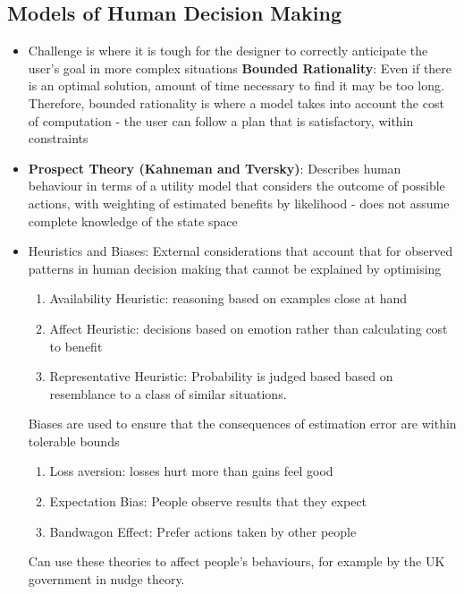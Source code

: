 \documentclass{article}
\begin{document}
\subsection{Models of Human Decision Making}
\begin{itemize}
    \item Challenge is where it is tough for the designer to correctly anticipate the user's goal in more complex situations
    \textbf{Bounded Rationality}: Even if there is an optimal solution, amount of time necessary to find it may be too long. Therefore, bounded rationality is where a model takes into account the cost of computation - the user can follow a plan that is satisfactory, within constraints
    \item \textbf{Prospect Theory (Kahneman and Tversky)}: Describes human behaviour in terms of a utility model that considers the outcome of possible actions, with weighting of estimated benefits by likelihood - does not assume complete knowledge of the state space
    \item Heuristics and Biases: External considerations that account that for observed patterns in human decision making that cannot be explained by optimising 
    \begin{enumerate}
        \item Availability Heuristic: reasoning based on examples close at hand
        \item Affect Heuristic: decisions based on emotion rather than calculating cost to benefit
        \item Representative Heuristic: Probability is judged based based on resemblance to a class of similar situations.
    \end{enumerate}
    
    Biases are used to ensure that the consequences of estimation error are within tolerable bounds
    \begin{enumerate}
        \item Loss aversion: losses hurt more than gains feel good
        \item Expectation Bias: People observe results that they expect
        \item Bandwagon Effect: Prefer actions taken by other people
    \end{enumerate}
    
    Can use these theories to affect people's behaviours, for example by the UK government in nudge theory.
\end{itemize}
\end{document}
